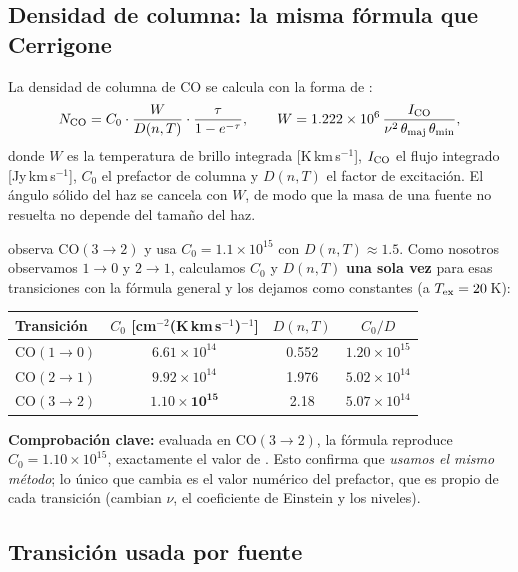 \documentclass[12pt, a4paper]{article}
\begin{document}
\subsection{Densidad de columna: la misma fórmula que Cerrigone}

La densidad de columna de CO se calcula con la forma de \citet[ec.~5]{cerrigone2012}:
\begin{equation}
    N_{\rm CO} = C_0 \cdot \frac{W}{D(n,T)} \cdot \frac{\tau}{1-e^{-\tau}},
    \qquad W = 1.222\times10^6\,\frac{I_{\rm CO}}{\nu^2\,\theta_{\rm maj}\,\theta_{\rm min}},
    \label{eq:NCO}
\end{equation}
donde $W$ es la temperatura de brillo integrada [K\,km\,s$^{-1}$], $I_{\rm CO}$ el flujo
integrado [Jy\,km\,s$^{-1}$], $C_0$ el prefactor de columna y $D(n,T)$ el factor de
excitación. El ángulo sólido del haz se cancela con $W$, de modo que la masa de una fuente
no resuelta no depende del tamaño del haz.

\citet{cerrigone2012} observa CO$(3\to2)$ y usa $C_0 = 1.1\times10^{15}$ con
$D(n,T)\approx1.5$. Como nosotros observamos $1\to0$ y $2\to1$, calculamos $C_0$ y $D(n,T)$
\textbf{una sola vez} para esas transiciones con la fórmula general \citep{mangum2015} y los
dejamos como constantes (a $T_{\rm ex}=20$\,K):

\begin{center}
\begin{tabular}{lccc}
\toprule
Transición & $C_0$ [cm$^{-2}$(K\,km\,s$^{-1}$)$^{-1}$] & $D(n,T)$ & $C_0/D$ \\
\midrule
CO$(1\to0)$ & $6.61\times10^{14}$ & 0.552 & $1.20\times10^{15}$ \\
CO$(2\to1)$ & $9.92\times10^{14}$ & 1.976 & $5.02\times10^{14}$ \\
CO$(3\to2)$ & $\mathbf{1.10\times10^{15}}$ & 2.18 & $5.07\times10^{14}$ \\
\bottomrule
\end{tabular}
\end{center}

\noindent \textbf{Comprobación clave:} evaluada en CO$(3\to2)$, la fórmula reproduce
$C_0 = 1.10\times10^{15}$, exactamente el valor de \citet{cerrigone2012}. Esto confirma que
\emph{usamos el mismo método}; lo único que cambia es el valor numérico del prefactor, que
es propio de cada transición (cambian $\nu$, el coeficiente de Einstein y los niveles).

\subsection{Transición usada por fuente}
\end{document}

